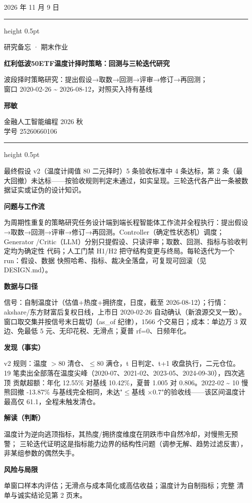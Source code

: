 \documentclass[a4paper,10pt]{article}
\newcommand{\ReportTitle}{红利低波50ETF温度计择时策略：回测与三轮迭代研究}
\newcommand{\ReportType}{研究备忘 · 期末作业}
\newcommand{\ReportDate}{2026 年 11 月 9 日}
\newcommand{\ReportScope}{波段择时策略研究：提出假设→取数→回测→评审→修订→再回测；\\ 窗口 2020-02-26 \textasciitilde{} 2026-08-12，对照买入持有基线}
\newcommand{\TeamName}{邢敏}
\newcommand{\DeskName}{金融人工智能编程 2026 秋\\学号 25260660106}
\newcommand{\KeyFinding}{最终假设 v2（温度计阈值 80 二元择时）5 条验收标准中 4 条达标，第 2 条（最大回撤）未达标——按验收规则判定未通过，如实呈现。三轮迭代各产出一条被数据证实或证伪的设计知识。}
\begin{document}
\begin{minipage}[t]{0.70\textwidth}
\vspace{0pt}
{\small\ReportDate}\par\medskip
{\color{MemoBlue}\hrule height 0.5pt}\smallskip
{\large\ReportType}\par
{\LARGE\bfseries\ReportTitle}\par\medskip
\ReportScope
\end{minipage}\hfill
\begin{minipage}[t]{0.23\textwidth}
\vspace{0pt}\raggedleft
\colorbox{MemoBlue}{\parbox[c][19mm][c]{0.86\linewidth}{\centering\color{white}\bfseries\TeamName}}\par\medskip
\DeskName
\end{minipage}
\par\bigskip
{\color{MemoBlue}\hrule height 0.5pt}\medskip
{\large\KeyFinding}\par\bigskip

\begin{minipage}[t]{0.61\textwidth}
\vspace{0pt}\raggedright\small
\setlength{\parskip}{4pt}
\textbf{问题与工作流}\par
为周期性重复的策略研究任务设计端到端长程智能体工作流并全程执行：提出假设
→取数→回测→评审→修订→再回测。Controller（确定性状态机）调度；Generator
/Critic（LLM）分别只提假设、只读评审；取数、回测、指标与验收判定均为确定性
代码；人工门禁 H1/H2 把守结构变更与终局。每轮迭代为一个 run：假设、数据
快照哈希、指标、裁决全落盘，可复现可回滚（见 DESIGN.md）。

\textbf{数据与口径}\par
信号：自制温度计（估值+热度+拥挤度，日度，截至 2026-08-12）；行情：
akshare/东方财富后复权日线，上市日 2020-02-26 自动确认（新浪源交叉一致）。
窗口取交集并按信号末日裁切（as\_of 纪律），1566 个交易日；成本：单边万 3
双边、免最低 5 元、无印花税、无滑点；夏普 rf=0、日频年化。

\textbf{发现（事实）}\par
v2 规则：温度 $>$80 清仓、$\leq$80 满仓，t 日判定、t+1 收盘执行，二元仓位。
19 笔卖出全部落在温度尖峰（2020-07、2021-02、2023-05、2024-09-30），四次逃顶
贡献超额：年化 12.55\% 对基线 10.42\%，夏普 1.005 对 0.806。2022-02
\textasciitilde{} 10 慢熊回撤 -13.87\% 与基线完全相同，未达"$\leq$基线
$\times$0.7"的验收线——该区间温度计最高仅 61.1，全程未触发清仓。

\textbf{解读（判断）}\par
温度计为逆向逃顶指标，其热度/拥挤度维度在阴跌市中自然冷却，对慢熊无预警；
三轮迭代证明这是指标能力边界的结构性问题（调参无解、趋势过滤反害），
非某组参数的偶然失手。

\textbf{风险与局限}\par
单窗口样本内评估；无滑点与成本简化或高估收益；温度计为自制指标；完整
清单与诚实结论见第 2 页末。
\end{minipage}\hfill
\begin{minipage}[t]{0.36\textwidth}
\vspace{0pt}\small

\end{minipage}
\par\vfill
\end{document}

